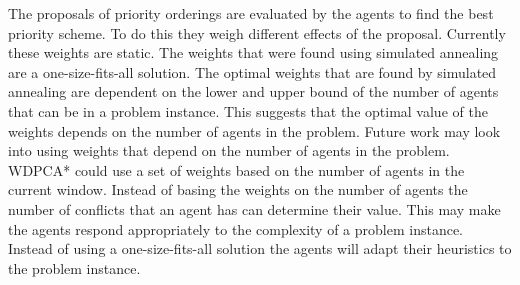 The proposals of priority orderings are evaluated by the agents to find the
best priority scheme. To do this they weigh different effects of the proposal.
Currently these weights are static. The weights that were found using simulated
annealing are a one-size-fits-all solution. The optimal weights that are found
by simulated annealing are dependent on the lower and upper bound of the number
of agents that can be in a problem instance. This suggests that the optimal
value of the weights depends on the number of agents in the problem. Future
work may look into using weights that depend on the number of agents in the
problem. WDPCA* could use a set of weights based on the number of agents in the
current window. Instead of basing the weights on the number of agents the
number of conflicts that an agent has can determine their value. This may make
the agents respond appropriately to the complexity of a problem instance.
Instead of using a one-size-fits-all solution the agents will adapt their
heuristics to the problem instance.


